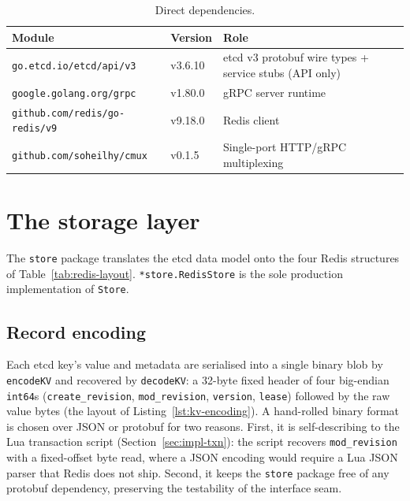 \begin{table}[h]
    \centering
    \caption{Direct dependencies.}
    \label{tab:impl-deps}
    \begin{tabular}{@{}lll@{}}
        \toprule
        \textbf{Module} & \textbf{Version} & \textbf{Role} \\
        \midrule
        \texttt{go.etcd.io/etcd/api/v3} & v3.6.10 & etcd v3 protobuf wire types + service stubs (API only) \\
        \texttt{google.golang.org/grpc} & v1.80.0 & gRPC server runtime \\
        \texttt{github.com/redis/go-redis/v9} & v9.18.0 & Redis client \\
        \texttt{github.com/soheilhy/cmux} & v0.1.5 & Single-port HTTP/gRPC multiplexing \\
        \bottomrule
    \end{tabular}
\end{table}

\section{The storage layer}
\label{sec:impl-store}

The \texttt{store} package translates the etcd data model onto the four Redis structures of Table~\ref{tab:redis-layout}. \texttt{*store.RedisStore} is the sole production implementation of \texttt{Store}.

\subsection{Record encoding}
\label{sec:impl-encoding}

Each etcd key's value and metadata are serialised into a single binary blob by \texttt{encodeKV} and recovered by \texttt{decodeKV}: a 32-byte fixed header of four big-endian \texttt{int64}s (\texttt{create\_revision}, \texttt{mod\_revision}, \texttt{version}, \texttt{lease}) followed by the raw value bytes (the layout of Listing~\ref{lst:kv-encoding}). A hand-rolled binary format is chosen over JSON or protobuf for two reasons. First, it is self-describing to the Lua transaction script (Section~\ref{sec:impl-txn}): the script recovers \texttt{mod\_revision} with a fixed-offset byte read, where a JSON encoding would require a Lua JSON parser that Redis does not ship. Second, it keeps the \texttt{store} package free of any protobuf dependency, preserving the testability of the interface seam.

